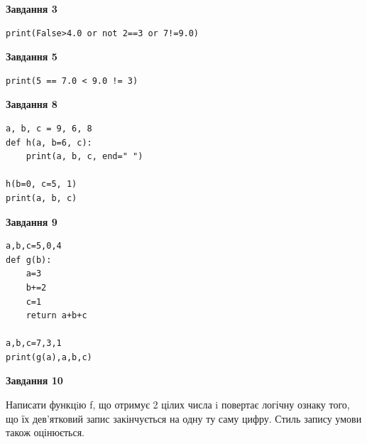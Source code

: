 \documentclass[12pt, ukrainian]{article}
\begin{document}
{\begin {large}
\begin{minipage}[t]{7.5cm}
\end{minipage}
\vline \hspace{6mm}
\begin{minipage}[t]{10.5cm}

\begin{center}
\textbf{Завдання 3}
\end{center}

\begin{verbatim}
print(False>4.0 or not 2==3 or 7!=9.0)
\end{verbatim}



\begin{center}
\textbf{Завдання 5}
\end{center}

\begin{verbatim}
print(5 == 7.0 < 9.0 != 3)
\end{verbatim}



\begin{center}
\textbf{Завдання 8}
\end{center}

\begin{verbatim}
a, b, c = 9, 6, 8
def h(a, b=6, c):
    print(a, b, c, end=" ")

h(b=0, c=5, 1)
print(a, b, c)
\end{verbatim}



\begin{center}
\textbf{Завдання 9}
\end{center}

\begin{verbatim}
a,b,c=5,0,4
def g(b):
    a=3
    b+=2
    c=1
    return a+b+c

a,b,c=7,3,1
print(g(a),a,b,c)
\end{verbatim}



\begin{center}
\textbf{Завдання 10}
\end{center}

Написати функцiю f, що отримує 2 цілих числа i повертає логічну ознаку того, що їх дев'ятковий запис закінчується на одну ту саму цифру. Стиль запису умови також оцінюється.\par

\end{minipage}

\end {large}}
\newpage
\end{document}
